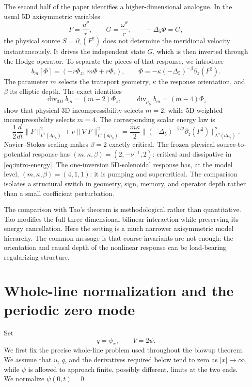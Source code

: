 \documentclass[11pt]{article}
\theoremstyle{definition}
\begin{document}
The second half of the paper identifies a higher-dimensional analogue.  In the usual 5D axisymmetric variables
\[
 F=\frac{u^\theta}{r},\qquad
 G=\frac{\omega^\theta}{r},\qquad
 -\Delta_5\Phi=G,
\]
the physical source $S=\partial_z(F^2)$ does not determine the meridional velocity instantaneously.  It drives the independent state $G$, which is then inverted through the Hodge operator.  To separate the pieces of that response, we introduce
\begin{equation}\label{eq:intro-5d}
 b_m[\Phi]=(-r\Phi_z,\,m\Phi+r\Phi_r),
 \qquad
 \Phi=-\kappa(-\Delta_5)^{-\beta}\partial_z(F^2).
\end{equation}
The parameter $m$ selects the transport geometry, $\kappa$ the response orientation, and $\beta$ its elliptic depth.  The exact identities
\[
 \operatorname{div}_{3D}b_m=(m-2)\Phi_z,
 \qquad
 \operatorname{div}_{\mu_5}b_m=(m-4)\Phi_z
\]
show that physical 3D incompressibility selects $m=2$, while 5D weighted incompressibility selects $m=4$.  The corresponding scalar energy law is
\begin{equation}\label{eq:intro-energy}
 \frac12\frac{d}{dt}\|F\|_{L^2(d\mu_5)}^2
 +\nu\|\nabla F\|_{L^2(d\mu_5)}^2
 =\frac{m\kappa}{2}
 \|(-\Delta_5)^{-\beta/2}\partial_z(F^2)\|_{L^2(d\mu_5)}^2.
\end{equation}
Navier--Stokes scaling makes $\beta=2$ exactly critical.  The frozen physical source-to-potential response has $(m,\kappa,\beta)=(2,-\nu^{-1},2)$: critical and dissipative in \eqref{eq:intro-energy}.  The one-inversion 5D-solenoidal response has, at the model level, $(m,\kappa,\beta)=(4,1,1)$: it is pumping and supercritical.  The comparison isolates a structural switch in geometry, sign, memory, and operator depth rather than a small coefficient perturbation.

The comparison with Tao's theorem is methodological rather than quantitative.  Tao modifies the full three-dimensional bilinear interaction while preserving its energy cancellation.  Here the setting is a much narrower axisymmetric model hierarchy.  The common message is that coarse invariants are not enough: the orientation and causal depth of the nonlinear response can be load-bearing regularizing structure.


\section{Whole-line normalization and the periodic zero mode}

Set
\[
 q=\psi_x,
 \qquad V=2\psi.
\]
We first fix the precise whole-line problem used throughout the blowup theorem.  We assume that $u$, $q$, and the derivatives required below tend to zero as $|x|\to\infty$, while $\psi$ is allowed to approach finite, possibly different, limits at the two ends.  We normalize $\psi(0,t)=0$.
\end{document}
